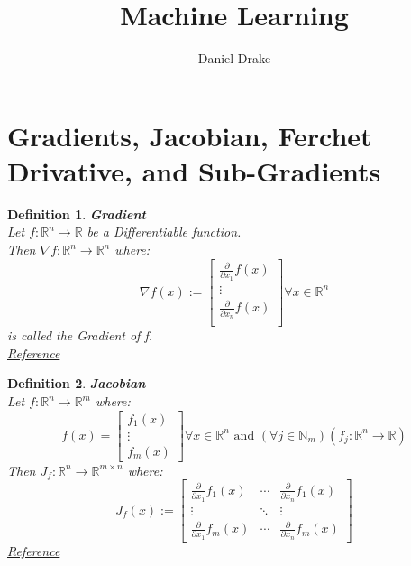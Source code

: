 \documentclass[12pt]{extarticle}
\title{Machine Learning}
\author{Daniel Drake}
\theoremstyle{plain}
\theoremstyle{Definition}
\newtheorem{def.}{Definition}[section]
\theoremstyle{Definition}
\theoremstyle{plain}
\begin{document}
		\maketitle			
\section{Gradients, Jacobian, Ferchet Drivative, and Sub-Gradients} 
\begin{def.} \textbf{Gradient} \\ 
	Let $f : \mathbb{R}^n \to \mathbb{R}$ be a Differentiable function. \\ 
	Then $\nabla f: \mathbb{R}^n \to \mathbb{R}^n$ where: \\ 
	\[
	\nabla f(x) := 
	\begin{bmatrix}
	\frac{\partial }{\partial x_1}f(x) \\ 
	\vdots \\
	\frac{\partial }{\partial x_n}f(x) \\ 				
	\end{bmatrix}
	\forall x \in \mathbb{R}^n
	\]
	is called the Gradient of f. \\
	\href{https://en.wikipedia.org/wiki/Gradient}{Reference}
\end{def.}
\begin{def.} \textbf{Jacobian} \\ 
	Let $f : \mathbb{R}^n \to \mathbb{R}^m$ where: 
	\[
	f(x) = 
	\begin{bmatrix}
	f_1(x) \\ 
	\vdots \\ 
	f_m(x) 
	\end{bmatrix}
	\forall x \in \mathbb{R}^n \text{ and } (\forall j \in \mathbb{N}_m) (f_j : \mathbb{R}^n \to \mathbb{R}) 
	\]
	Then $J_f : \mathbb{R}^n \to \mathbb{R}^{m \times n}$ where: \\  
	\[
	J_f(x) := 
	\begin{bmatrix} 
	\frac{\partial }{\partial x_1}f_1(x) & \cdots & \frac{\partial }{\partial x_n}f_1(x) \\
	\vdots & \ddots & \vdots \\ 
	\frac{\partial }{\partial x_1}f_m(x) & \cdots & \frac{\partial }{\partial x_n}f_m(x) 
	\end{bmatrix}
	\]
	\href{https://en.wikipedia.org/wiki/Jacobian_matrix_and_determinant}{Reference}
\end{def.}
\end{document}
